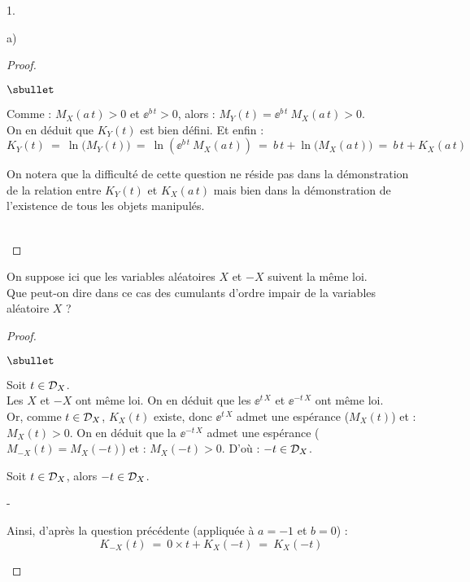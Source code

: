 \documentclass[11pt]{article}%
\begin{document}
\begin{noliste}{1.}
\begin{noliste}{a)}
\begin{proof}
\begin{noliste}{$\sbullet$}
      \item Comme : $M_X(a \, t) >0$ et $\ee^{b \, t} >0$, alors :
        $M_Y(t) = \ee^{b \, t} \ M_X(a \, t) >0$.\\
        On en déduit que $K_Y(t)$ est bien défini. Et enfin :
        \[
          K_Y(t) \ = \ \ln\big(M_Y(t)\big)
          \ = \ \ln\left(\ee^{b \, t} \ M_X(a \, t)\right)
          \ = \ b \, t + \ln\big(M_X(a \, t)\big)
          \ = \ b \, t + K_X(a \, t)
        \]
      \end{noliste}




      
      \begin{remark}
        On notera que la difficulté de cette question ne réside pas
        dans la démonstration de la relation entre $K_Y(t)$ et $K_X(a
        \, t)$ mais bien dans la démonstration de l'existence de tous
        les objets manipulés.
      \end{remark}~\\[-1.4cm]
    \end{proof}


    \newpage
    
    
  \item On suppose ici que les variables aléatoires $X$ et $-X$
    suivent la même loi.\\
    Que peut-on dire dans ce cas des cumulants d'ordre impair de la
    variables aléatoire $X$ ?
    \begin{proof}~
      \begin{noliste}{$\sbullet$}
      \item Soit $t \in {\cal D}_X$.\\
        Les \var $X$ et $-X$ ont même loi. On en déduit que les
        \var $\ee^{t \, X}$ et $\ee^{-t \, X}$ ont même loi.\\
        Or, comme $t \in {\cal D}_X$, $K_X(t)$ existe, donc $\ee^{t \,
          X}$ admet une espérance ($M_X(t)$) et : $M_X(t)>0$.
        On en déduit que la \var $\ee^{-t \, X}$ admet une espérance
        ($M_{-X}(t) = M_X(-t)$) et : $M_{X}(-t) >0$. D'où :
        $-t \in {\cal D}_X$.
        
      \item Soit $t \in {\cal D}_X$, alors $-t \in {\cal D}_X$.
        \begin{noliste}{-}
        \item Ainsi, d'après la question précédente (appliquée à $a=-1$ et
          $b=0$) :
          \[
            K_{-X}(t) \ = \ 0\times t + K_X(-t) \ = \ K_X(-t)
          \]
          

\end{noliste}
\end{noliste}
\end{proof}
\end{noliste}
\end{noliste}
\end{document}
